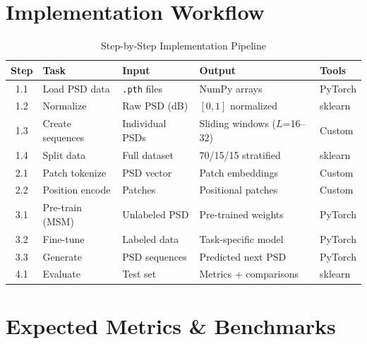 \documentclass[12pt, a4paper]{article}
\begin{document}
\section{Implementation Workflow}

\begin{table}[H]
\centering
\caption{Step-by-Step Implementation Pipeline}
\label{tab:pipeline}
\begin{tabular}{@{}clp{3cm}p{3cm}l@{}}
\toprule
\textbf{Step} & \textbf{Task}            & \textbf{Input}          & \textbf{Output}            & \textbf{Tools} \\
\midrule
1.1 & Load PSD data            & \texttt{.pth} files     & NumPy arrays               & PyTorch \\
1.2 & Normalize                & Raw PSD (dB)            & $[0,1]$ normalized         & sklearn \\
1.3 & Create sequences         & Individual PSDs         & Sliding windows ($L$=16--32) & Custom \\
1.4 & Split data               & Full dataset            & 70/15/15 stratified        & sklearn \\
2.1 & Patch tokenize           & PSD vector              & Patch embeddings           & Custom \\
2.2 & Position encode          & Patches                 & Positional patches         & Custom \\
3.1 & Pre-train (MSM)          & Unlabeled PSD           & Pre-trained weights        & PyTorch \\
3.2 & Fine-tune                & Labeled data            & Task-specific model        & PyTorch \\
3.3 & Generate                 & PSD sequences           & Predicted next PSD         & PyTorch \\
4.1 & Evaluate                 & Test set                & Metrics + comparisons      & sklearn \\
\bottomrule
\end{tabular}
\end{table}


\section{Expected Metrics \& Benchmarks}
\end{document}
